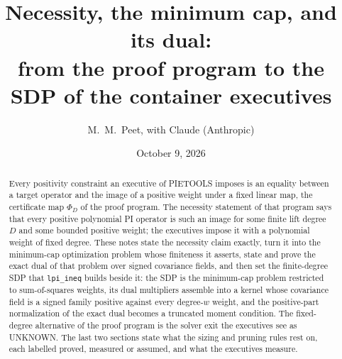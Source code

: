 \documentclass[12pt]{article}
\title{Necessity, the minimum cap, and its dual: \\ from the proof program to the SDP of the container executives}
\author{M.~M.~Peet, with Claude (Anthropic)}
\date{October 9, 2026}
\newcommand{\code}[1]{\texttt{#1}}
\theoremstyle{plain}
\theoremstyle{definition}
\theoremstyle{remark}
\begin{document}
\maketitle

\begin{abstract}
\noindent Every positivity constraint an executive of PIETOOLS imposes is an equality between a target operator and the image of a positive weight under a fixed linear map, the certificate map $\Phi_D$ of the proof program. The necessity statement of that program says that every positive polynomial PI operator is such an image for some finite lift degree $D$ and some bounded positive weight; the executives impose it with a polynomial weight of fixed degree. These notes state the necessity claim exactly, turn it into the minimum-cap optimization problem whose finiteness it asserts, state and prove the exact dual of that problem over signed covariance fields, and then set the finite-degree SDP that \code{lpi\_ineq} builds beside it: the SDP is the minimum-cap problem restricted to sum-of-squares weights, its dual multipliers assemble into a kernel whose covariance field is a signed family positive against every degree-$w$ weight, and the positive-part normalization of the exact dual becomes a truncated moment condition. The fixed-degree alternative of the proof program is the solver exit the executives see as UNKNOWN. The last two sections state what the sizing and pruning rules rest on, each labelled proved, measured or assumed, and what the executives measure.
\end{abstract}

\tableofcontents
\end{document}
